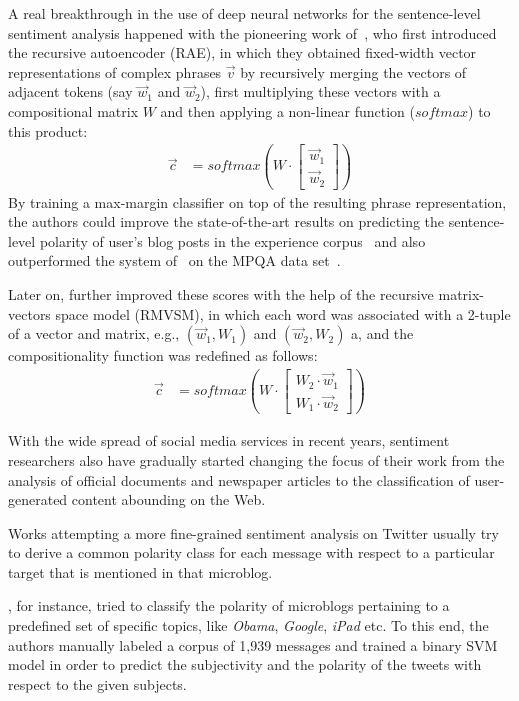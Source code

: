A real breakthrough in the use of deep neural networks for the
sentence-level sentiment analysis happened with the pioneering work
of~\citet{Socher:11}, who first introduced the recursive autoencoder
(RAE), in which they obtained fixed-width vector representations of
complex phrases $\vec{v}$ by recursively merging the vectors of
adjacent tokens (say $\vec{w}_1$ and $\vec{w}_2$), first multiplying
these vectors with a compositional matrix $W$ and then applying a
non-linear function ($softmax$) to this product:
\begin{align*}
  \vec{c} &= softmax\left(W\cdot\begin{bmatrix}
  \vec{w}_1\\
  \vec{w}_2
  \end{bmatrix}\right)
\end{align*}
By training a max-margin classifier on top of the resulting phrase
representation, the authors could improve the state-of-the-art results
on predicting the sentence-level polarity of user's blog posts in the
experience corpus~\cite{Potts:10} and also outperformed the system
of~\citet{Nasukawa:03} on the MPQA data set~\cite{Wiebe:05}.

Later on, \citet{Socher:12} further improved these scores with the
help of the recursive matrix-vectors space model (RMVSM), in which
each word was associated with a 2-tuple of a vector and matrix, e.g.,
$(\vec{w}_1, W_1)$ and $(\vec{w}_2, W_2)$ a, and the compositionality
function was redefined as follows:
\begin{align*}
  \vec{c} &= softmax\left(W\cdot\begin{bmatrix}
  W_2\cdot\vec{w}_1\\
  W_1\cdot\vec{w}_2
  \end{bmatrix}\right)
\end{align*}

With the wide spread of social media services in recent years,
sentiment researchers also have gradually started changing the focus
of their work from the analysis of official documents and newspaper
articles to the classification of user-generated content abounding on
the Web.

Works attempting a more fine-grained sentiment analysis on Twitter
usually try to derive a common polarity class for each message with
respect to a particular target that is mentioned in that microblog.

\citet{Jiang:11}, for instance, tried to classify the polarity of
microblogs pertaining to a predefined set of specific topics, like
\emph{Obama}, \emph{Google}, \emph{iPad} etc.  To this end, the
authors manually labeled a corpus of 1,939 messages and trained a
binary SVM model in order to predict the subjectivity and the polarity
of the tweets with respect to the given subjects.

